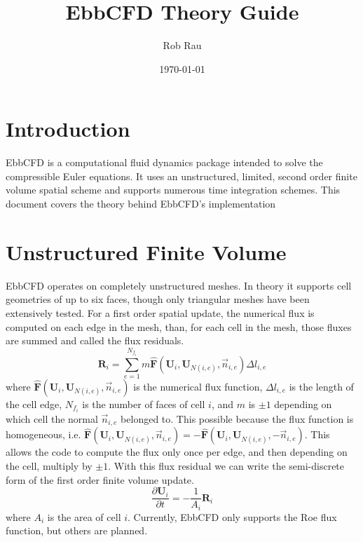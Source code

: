 \documentclass[12pt,parskip=full]{article}
\numberwithin{subsection}{section}
\begin{document}
	\vspace{-4ex}
	\title{EbbCFD Theory Guide\vspace{-3.5ex}}
	\author{Rob Rau\vspace{-4ex}}
	\date{\today\vspace{-4ex}}
	\maketitle

	\section{Introduction}
		EbbCFD is a computational fluid dynamics package intended to solve the compressible Euler equations.
		It uses an unstructured, limited, second order finite volume spatial scheme and supports numerous
		time integration schemes. This document covers the theory behind EbbCFD's implementation

	\section{Unstructured Finite Volume}
		EbbCFD operates on completely unstructured meshes. In theory it supports cell geometries of up to six faces,
		though only triangular meshes have been extensively tested. For a first order spatial update, the numerical flux
		is computed on each edge in the mesh, than, for each cell in the mesh, those fluxes are summed and called the
		flux residuals.
		\begin{equation}
			\mathbf{R}_i = \sum_{e = 1}^{N_{f_i}}{m\mathbf{\hat{F}}(\mathbf{U}_i, \mathbf{U}_{N(i,e)}, \vec{n}_{i,e}) \Delta l_{i,e}}
		\end{equation}
		where $\mathbf{\hat{F}}(\mathbf{U}_i, \mathbf{U}_{N(i,e)}, \vec{n}_{i,e})$ is the numerical flux function,
		$\Delta l_{i,e}$ is the length of the cell edge, $N_{f_i}$ is the number of faces of cell $i$, and $m$ is $\pm 1$
		depending on which cell the normal $\vec{n}_{i,e}$ belonged to. This possible because the flux function is homogeneous, i.e.
		$\mathbf{\hat{F}}(\mathbf{U}_i, \mathbf{U}_{N(i,e)}, \vec{n}_{i,e}) = -\mathbf{\hat{F}}(\mathbf{U}_i, \mathbf{U}_{N(i,e)}, -\vec{n}_{i,e})$.
		This allows the code to compute the flux only once per edge, and then depending on the cell, multiply by $\pm 1$.
		With this flux residual we can write the semi-discrete form of the first order finite volume update.
		\begin{equation}
			\frac{\partial \mathbf{U}_i}{\partial t} = -\frac{1}{A_i}\mathbf{R}_i
		\end{equation}
		where $A_i$ is the area of cell $i$. Currently, EbbCFD only supports the Roe flux function, but others are planned.
\end{document}
